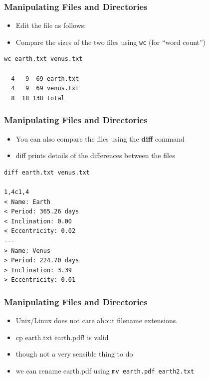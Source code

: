 \documentclass{beamer}
\begin{document}
\begin{frame}[fragile]\frametitle{Manipulating Files and Directories}
\begin{itemize}
\item Edit the file as follows:
\end{itemize}
\bigskip
\begin{itemize}
\item Compare the sizes of the two files using \lstinline!wc! (for “word count”) 
\end{itemize}
\begin{block}{}
\begin{lstlisting}[linewidth=5cm]
wc earth.txt venus.txt

  4   9  69 earth.txt
  4   9  69 venus.txt
  8  18 138 total
\end{lstlisting}
\end{block}
\end{frame}

\begin{frame}[fragile]\frametitle{Manipulating Files and Directories}
\begin{itemize}
\item You can also compare the files using the \textbf{diff} command
\item diff prints details of the differences between the files
\end{itemize}
\begin{block}{}
\begin{lstlisting}[linewidth=5cm]
diff earth.txt venus.txt

1,4c1,4
< Name: Earth
< Period: 365.26 days
< Inclination: 0.00
< Eccentricity: 0.02
---
> Name: Venus
> Period: 224.70 days
> Inclination: 3.39
> Eccentricity: 0.01
\end{lstlisting}
\end{block}
\end{frame}


\begin{frame}[fragile]\frametitle{Manipulating Files and Directories}
\begin{itemize}
\item Unix/Linux does not care about filename extensions.
\item cp earth.txt earth.pdf! is valid 
\item though not a very sensible thing to do
\bigskip
\item we can rename earth.pdf using \lstinline!mv earth.pdf earth2.txt!

\end{itemize}
\end{frame}
\end{document}
